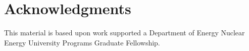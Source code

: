 \documentclass{anstrans}
\begin{document}
\section{Acknowledgments}
This material is based upon work supported a Department of Energy Nuclear
Energy University Programs Graduate Fellowship.



\end{document}
